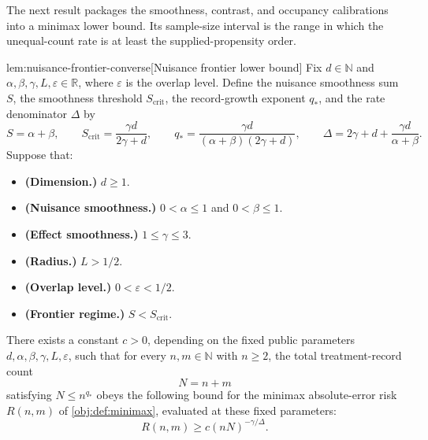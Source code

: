 \documentclass[11pt]{article}
\begin{document}
The next result packages the smoothness, contrast, and occupancy calibrations into a minimax lower bound. Its sample-size interval is the range in which the unequal-count rate is at least the supplied-propensity order.

\begin{lemmav}{lem:nuisance-frontier-converse}[Nuisance frontier lower bound]
Fix \(d\in\mathbb N\) and \(\alpha,\beta,\gamma,L,\varepsilon\in\mathbb R\), where \(\varepsilon\) is the overlap level. Define the nuisance smoothness sum \(S\), the smoothness threshold \(S_{\mathrm{crit}}\), the record-growth exponent \(q_*\), and the rate denominator \(\Delta\) by
\[
S=\alpha+\beta,\qquad
S_{\mathrm{crit}}=\frac{\gamma d}{2\gamma+d},\qquad
q_*=\frac{\gamma d}{(\alpha+\beta)(2\gamma+d)},\qquad
\Delta=2\gamma+d+\frac{\gamma d}{\alpha+\beta}.
\]
Suppose that:
\begin{itemize}
\item \textbf{(Dimension.)} \(d\ge1\).
\item \textbf{(Nuisance smoothness.)} \(0<\alpha\le1\) and \(0<\beta\le1\).
\item \textbf{(Effect smoothness.)} \(1\le\gamma\le3\).
\item \textbf{(Radius.)} \(L>1/2\).
\item \textbf{(Overlap level.)} \(0<\varepsilon<1/2\).
\item \textbf{(Frontier regime.)} \(S<S_{\mathrm{crit}}\).
\end{itemize}
There exists a constant \(c>0\), depending on the fixed public parameters \(d,\alpha,\beta,\gamma,L,\varepsilon\), such that for every \(n,m\in\mathbb N\) with \(n\ge2\), the total treatment-record count
\[
N=n+m
\]
satisfying \(N\le n^{q_*}\) obeys the following bound for the minimax absolute-error risk \(R(n,m)\) of \cref{obj:def:minimax}, evaluated at these fixed parameters:
\[
R(n,m)\ge c(nN)^{-\gamma/\Delta}.
\]
\end{lemmav}
\end{document}
